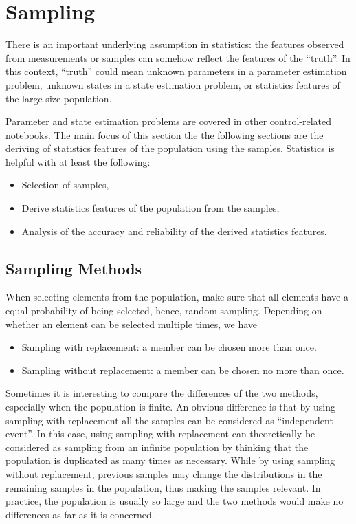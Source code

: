 \chapter{Sampling} \label{ch:sampling}

There is an important underlying assumption in statistics: the features observed from measurements or samples can somehow reflect the features of the ``truth''. In this context, ``truth'' could mean unknown parameters in a parameter estimation problem, unknown states in a state estimation problem, or statistics features of the large size population. 

Parameter and state estimation problems are covered in other control-related notebooks. The main focus of this section the the following sections are the deriving of statistics features of the population using the samples. Statistics is helpful with at least the following:
\begin{itemize}
	\item Selection of samples,
	\item Derive statistics features of the population from the samples,
	\item Analysis of the accuracy and reliability of the derived statistics features.
\end{itemize}

\section{Sampling Methods}

When selecting elements from the population, make sure that all elements have a equal probability of being selected, hence, random sampling. Depending on whether an element can be selected multiple times, we have
\begin{itemize}
  \item Sampling with replacement: a member can be chosen more than once.
  \item Sampling without replacement: a member can be chosen no more than once.
\end{itemize}

Sometimes it is interesting to compare the differences of the two methods, especially when the population is finite. An obvious difference is that by using sampling with replacement all the samples can be considered as ``independent event''. In this case, using sampling with replacement can theoretically be considered as sampling from an infinite population by thinking that the population is duplicated as many times as necessary. While by using sampling without replacement, previous samples may change the distributions in the remaining samples in the population, thus making the samples relevant. In practice, the population is usually so large and the two methods would make no differences as far as it is concerned.

